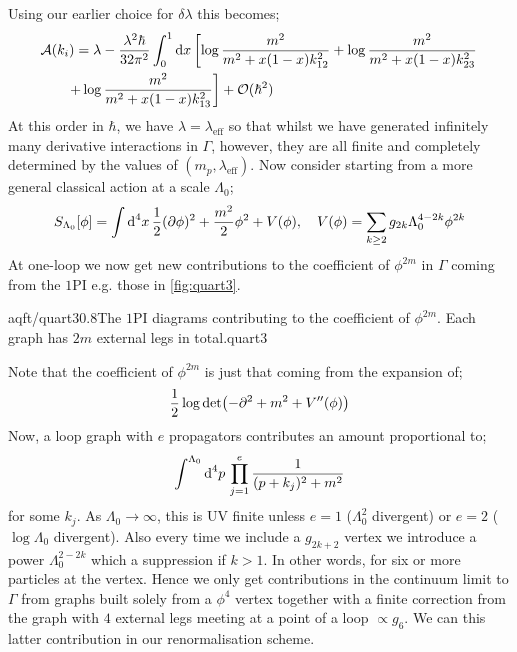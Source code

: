 Using our earlier choice for $\delta \lambda$ this becomes;
\begin{align*}
&\mathcal{A}(k_i) = \lambda - \frac{\lambda^2 \hbar}{32\pi^2} \int_0^{1}{\upd{x}}\left[ \log\frac{m^2}{m^2 + x(1 - x)k_{12}^2} + \log\frac{m^2}{m^2 + x(1 - x)k_{23}^2}\right. \\
& \qquad \left. + \log\frac{m^2}{m^2 + x(1 - x)k_{13}^2}\right] + \mO(\hbar^2)
\end{align*}
At this order in $\hbar$, we have $\lambda = \lambda_{\text{eff}}$ so that whilst we have generated infinitely many derivative interactions in $\Gamma$, however, they are all finite and completely determined by the values of $(m_p, \lambda_{\text{eff}})$. Now consider starting from a more general classical action at a scale $\Lambda_0$;
\begin{equation*}
S_{\Lambda_0}[\phi] = \int{\text{d}^4 x \,\frac{1}{2}(\partial\phi)^2 + \frac{m^2}{2}\phi^2 + V(\phi)}, \quad V(\phi) = \sum_{k \geq 2}{g_{2k}\Lambda_0^{4 - 2k}\phi^{2k}}
\end{equation*}
At one-loop we now get new contributions to the coefficient of $\phi^{2m}$ in $\Gamma$ coming from the $1$PI e.g. those in \autoref{fig:quart3}. 
\begin{mygraphic}{aqft/quart3}{0.8}{The $1$PI diagrams contributing to the coefficient of $\phi^{2m}$. Each graph has $2m$ external legs in total.}{quart3}\end{mygraphic}
Note that the coefficient of $\phi^{2m}$ is just that coming from the expansion of;
\begin{equation*}
\frac{1}{2}\log \det \left(-\del^2 + m^2 + V^{\prime\prime}(\phi)\right)
\end{equation*}
Now, a loop graph with $e$ propagators contributes an amount proportional to;
\begin{equation*}
\int^{\Lambda_0}{\text{d}^4 p  \,\prod_{j = 1}^{e}{\frac{1}{(p + k_j)^2 + m^2}}}
\end{equation*}
for some $k_j$. As $\Lambda_0 \rightarrow \infty$, this is UV finite unless $e = 1$ ($\Lambda_0^2$ divergent) or $e = 2$ ($\log \Lambda_0$ divergent). Also every time we include a $g_{2k + 2}$ vertex we introduce a power $\Lambda_0^{2 - 2k}$ which a suppression if $k > 1$. In other words, for six or more particles at the vertex. Hence we only get contributions in the continuum limit to $\Gamma$ from graphs built solely from a $\phi^4$ vertex together with a finite correction from the graph with $4$ external legs meeting at a point of a loop $\propto g_6$. We can this latter contribution in our renormalisation scheme.
